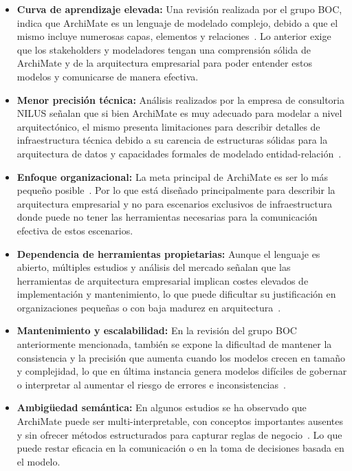 \begin{itemize}
	\item \textbf{Curva de aprendizaje elevada:} Una revisión realizada por el grupo BOC, indica que ArchiMate es un lenguaje de modelado complejo, debido a que el mismo incluye numerosas capas, elementos y relaciones~\cite{BOC01}. Lo anterior exige que los stakeholders y modeladores tengan una comprensión sólida de ArchiMate y de la arquitectura empresarial para poder entender estos modelos y comunicarse de manera efectiva.
	\item \textbf{Menor precisión técnica:} Análisis realizados por la empresa de consultoria NILUS señalan que si bien ArchiMate es muy adecuado para modelar a nivel arquitectónico, el mismo presenta limitaciones para describir detalles de infraestructura técnica debido a su carencia de estructuras sólidas para la arquitectura de datos y capacidades formales de modelado entidad-relación~\cite{Nilus01}.
	\item \textbf{Enfoque organizacional:} La meta principal de ArchiMate es ser lo más pequeño posible~\cite{ArchiMate}. Por lo que está diseñado principalmente para describir la arquitectura empresarial y no para escenarios exclusivos de infraestructura donde puede no tener las herramientas necesarias para la comunicación efectiva de estos escenarios.
	\item \textbf{Dependencia de herramientas propietarias:} Aunque el lenguaje es abierto, múltiples estudios y análisis del mercado señalan que las herramientas de arquitectura empresarial implican costes elevados de implementación y mantenimiento, lo que puede dificultar su justificación en organizaciones pequeñas o con baja madurez en arquitectura~\cite{kenresearch01}.
	\item \textbf{Mantenimiento y escalabilidad:} En la revisión del grupo BOC anteriormente mencionada, también se expone la dificultad de mantener la consistencia y la precisión que aumenta cuando los modelos crecen en tamaño y complejidad, lo que en última instancia genera modelos difíciles de gobernar o interpretar al aumentar el riesgo de errores e inconsistencias~\cite{BOC01}.
	\item \textbf{Ambigüedad semántica:} En algunos estudios se ha observado que ArchiMate puede ser multi-interpretable, con conceptos importantes ausentes y sin ofrecer métodos estructurados para capturar reglas de negocio~\cite{Krouwel01}. Lo que puede restar eficacia en la comunicación o en la toma de decisiones basada en el modelo.
\end{itemize}


